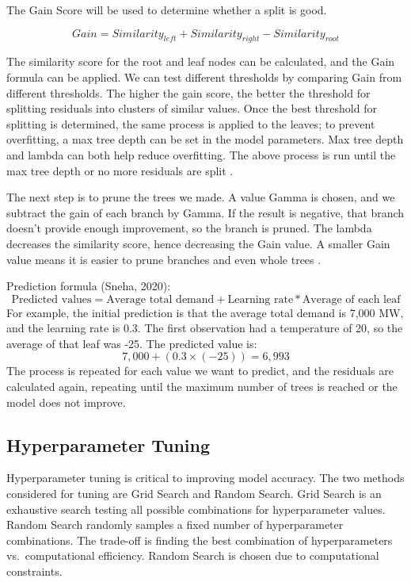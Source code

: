 \documentclass[mstat,12pt]{unswthesis}
\begin{document}
The Gain Score will be used to determine whether a split is good.

\[
Gain = {Similarity}_{left} + {Similarity}_{right} - {Similarity}_{root}
\]

The similarity score for the root and leaf nodes can be calculated, and
the Gain formula can be applied. We can test different thresholds by
comparing Gain from different thresholds. The higher the gain score, the
better the threshold for splitting residuals into clusters of similar
values. Once the best threshold for splitting is determined, the same
process is applied to the leaves; to prevent overfitting, a max tree
depth can be set in the model parameters. Max tree depth and lambda can
both help reduce overfitting. The above process is run until the max
tree depth or no more residuals are split \cite{a2016_how}.

The next step is to prune the trees we made. A value Gamma is chosen,
and we subtract the gain of each branch by Gamma. If the result is
negative, that branch doesn't provide enough improvement, so the branch
is pruned. The lambda decreases the similarity score, hence decreasing
the Gain value. A smaller Gain value means it is easier to prune
branches and even whole trees \cite{a2016_how}.

Prediction formula (Sneha, 2020): \[
\text{Predicted values} = \text{Average total demand} + \text{Learning rate} * \text{Average of each leaf}
\] For example, the initial prediction is that the average total demand
is 7,000 MW, and the learning rate is 0.3. The first observation had a
temperature of 20, so the average of that leaf was -25. The predicted
value is: \[
7,000 + (0.3 \times (-25)) = 6,993
\] The process is repeated for each value we want to predict, and the
residuals are calculated again, repeating until the maximum number of
trees is reached or the model does not improve.

\hypertarget{hyperparameter-tuning}{%
\subsection{Hyperparameter Tuning}\label{hyperparameter-tuning}}

Hyperparameter tuning is critical to improving model accuracy. The two
methods considered for tuning are Grid Search and Random Search. Grid
Search is an exhaustive search testing all possible combinations for
hyperparameter values. Random Search randomly samples a fixed number of
hyperparameter combinations. The trade-off is finding the best
combination of hyperparameters vs.~computational efficiency. Random
Search is chosen due to computational constraints.
\end{document}
